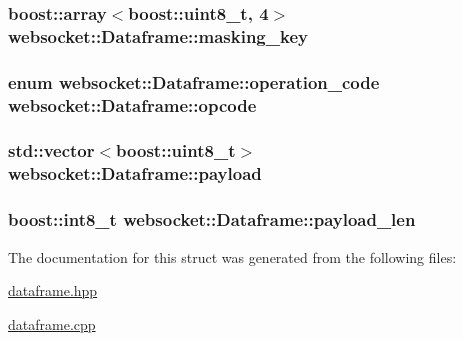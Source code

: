 \subsubsection[{\texorpdfstring{masking\+\_\+key}{masking_key}}]{\setlength{\rightskip}{0pt plus 5cm}boost\+::array$<$boost\+::uint8\+\_\+t, 4$>$ websocket\+::\+Dataframe\+::masking\+\_\+key}\hypertarget{structwebsocket_1_1Dataframe_ac57a24516f43eacf07e4a2273c5d014b}{}\label{structwebsocket_1_1Dataframe_ac57a24516f43eacf07e4a2273c5d014b}
\subsubsection[{\texorpdfstring{opcode}{opcode}}]{\setlength{\rightskip}{0pt plus 5cm}enum {\bf websocket\+::\+Dataframe\+::operation\+\_\+code}  websocket\+::\+Dataframe\+::opcode}\hypertarget{structwebsocket_1_1Dataframe_a5e3edcbe1a37e58024ec58f9f06dad38}{}\label{structwebsocket_1_1Dataframe_a5e3edcbe1a37e58024ec58f9f06dad38}
\subsubsection[{\texorpdfstring{payload}{payload}}]{\setlength{\rightskip}{0pt plus 5cm}std\+::vector$<$boost\+::uint8\+\_\+t$>$ websocket\+::\+Dataframe\+::payload}\hypertarget{structwebsocket_1_1Dataframe_a809c2f387810fa2accd6602a290a6876}{}\label{structwebsocket_1_1Dataframe_a809c2f387810fa2accd6602a290a6876}
\subsubsection[{\texorpdfstring{payload\+\_\+len}{payload_len}}]{\setlength{\rightskip}{0pt plus 5cm}boost\+::int8\+\_\+t websocket\+::\+Dataframe\+::payload\+\_\+len}\hypertarget{structwebsocket_1_1Dataframe_ae8d89a8c10d3b372c09d65364613c716}{}\label{structwebsocket_1_1Dataframe_ae8d89a8c10d3b372c09d65364613c716}


The documentation for this struct was generated from the following files\+:\begin{DoxyCompactItemize}
\item 
\hyperlink{dataframe_8hpp}{dataframe.\+hpp}\item 
\hyperlink{dataframe_8cpp}{dataframe.\+cpp}\end{DoxyCompactItemize}
